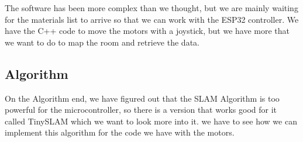 The software has been more complex than we thought, but we are mainly waiting for the materials list to arrive so that we can work with the ESP32 controller. We have the C++ code to move the motors with a joystick, but we have more that we want to do to map the room and retrieve the data. \par

\subsection{Algorithm}
On the Algorithm end, we have figured out that the SLAM Algorithm is too powerful for the microcontroller, so there is a version that works good for it called TinySLAM which we want to look more into it. we have to see how we can implement this algorithm for the code we have with the motors. \par
